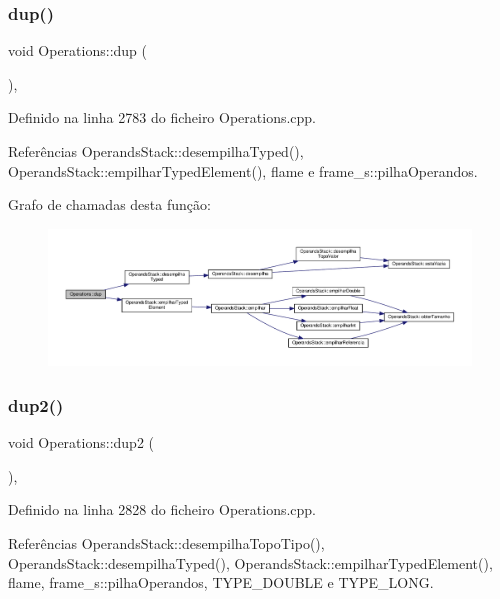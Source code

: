 \subsubsection{\texorpdfstring{dup()}{dup()}}
{\footnotesize\ttfamily void Operations\+::dup (\begin{DoxyParamCaption}{ }\end{DoxyParamCaption})\hspace{0.3cm}{\ttfamily [static]}, {\ttfamily [private]}}



Definido na linha 2783 do ficheiro Operations.\+cpp.



Referências Operands\+Stack\+::desempilha\+Typed(), Operands\+Stack\+::empilhar\+Typed\+Element(), flame e frame\+\_\+s\+::pilha\+Operandos.

Grafo de chamadas desta função\+:
\nopagebreak
\begin{figure}[H]
\begin{center}
\leavevmode
\includegraphics[width=350pt]{classOperations_a0cba4ff895f2e3908eea5b39305481a4_cgraph}
\end{center}
\end{figure}
\mbox{\label{classOperations_a7cb6985281b1ab32e905e4726ef2c964}} 
\subsubsection{\texorpdfstring{dup2()}{dup2()}}
{\footnotesize\ttfamily void Operations\+::dup2 (\begin{DoxyParamCaption}{ }\end{DoxyParamCaption})\hspace{0.3cm}{\ttfamily [static]}, {\ttfamily [private]}}



Definido na linha 2828 do ficheiro Operations.\+cpp.



Referências Operands\+Stack\+::desempilha\+Topo\+Tipo(), Operands\+Stack\+::desempilha\+Typed(), Operands\+Stack\+::empilhar\+Typed\+Element(), flame, frame\+\_\+s\+::pilha\+Operandos, T\+Y\+P\+E\+\_\+\+D\+O\+U\+B\+LE e T\+Y\+P\+E\+\_\+\+L\+O\+NG.

